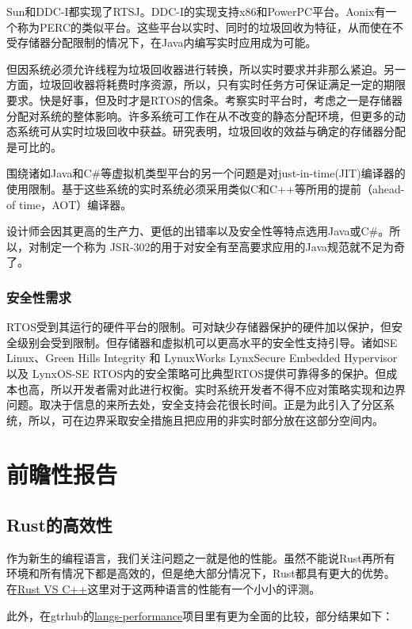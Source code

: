\documentclass[12pt, a4paper]{article}
\begin{document}
	Sun和DDC-I都实现了RTSJ。DDC-I的实现支持x86和PowerPC平台。Aonix有一个称为PERC的类似平台。这些平台以实时、同时的垃圾回收为特征，从而使在不受存储器分配限制的情况下，在Java内编写实时应用成为可能。
	
	但因系统必须允许线程为垃圾回收器进行转换，所以实时要求并非那么紧迫。另一方面，垃圾回收器将耗费时序资源，所以，只有实时任务方可保证满足一定的期限要求。快是好事，但及时才是RTOS的信条。考察实时平台时，考虑之一是存储器分配对系统的整体影响。许多系统可工作在从不改变的静态分配环境，但更多的动态系统可从实时垃圾回收中获益。研究表明，垃圾回收的效益与确定的存储器分配是可比的。
	
	围绕诸如Java和C\#等虚拟机类型平台的另一个问题是对just-in-time(JIT)编译器的使用限制。基于这些系统的实时系统必须采用类似C和C++等所用的提前（ahead-of time，AOT）编译器。
	
	设计师会因其更高的生产力、更低的出错率以及安全性等特点选用Java或C\#。所以，对制定一个称为 JSR-302的用于对安全有至高要求应用的Java规范就不足为奇了。
	
	\subsubsection{安全性需求}
	RTOS受到其运行的硬件平台的限制。可对缺少存储器保护的硬件加以保护，但安全级别会受到限制。但存储器和虚拟机可以更高水平的安全性支持引导。诸如SE Linux、Green Hills Integrity 和 LynuxWorks LynxSecure Embedded Hypervisor以及 LynxOS-SE RTOS内的安全策略可比典型RTOS提供可靠得多的保护。但成本也高，所以开发者需对此进行权衡。实时系统开发者不得不应对策略实现和边界问题。取决于信息的来所去处，安全支持会花很长时间。正是为此引入了分区系统，所以，可在边界采取安全措施且把应用的非实时部分放在这部分空间内。
	
	\section{前瞻性报告}
	
	\subsection{Rust的高效性}
	作为新生的编程语言，我们关注问题之一就是他的性能。虽然不能说Rust再所有环境和所有情况下都是高效的，但是绝大部分情况下，Rust都具有更大的优势。在\href{http://cantrip.org/rust-vs-c++.html}{Rust VS C++}这里对于这两种语言的性能有一个小小的评测。
	
	此外，在gtrhub的\href{https://github.com/famzah/langs-performance}{langs-performance}项目里有更为全面的比较，部分结果如下：
	
\end{document}
